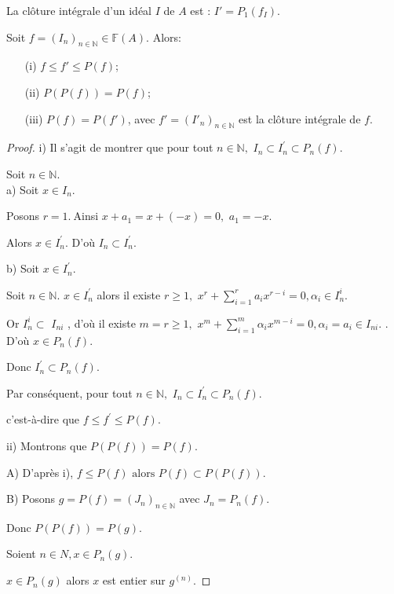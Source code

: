 \begin{maremarque}
	La clôture intégrale d'un idéal $I$ de $A$ est : $I'=P_1(f_I)$.
\end{maremarque}
\begin{maproposition}
	Soit $f=(I_n)_{n \in \mathbb{N}} \in \mathbb{F}(A)$. Alors:\\
	\begin{enumerate}
		\item[(i)] $ f \leqslant f' \leqslant P(f)$;
		\item[(ii)] $ P(P(f)) = P(f)$;
		\item[(iii)] $P(f) = P(f')$, avec $f'=(I'_n)_{n \in \mathbb{N}}$ est la clôture intégrale de $f$.
	\end{enumerate}
\end{maproposition}
\begin{proof}
	i) Il s'agit de montrer que pour tout $n\in \mathbb{N},$ $I_{n}\subset I_{n}^{\prime }\subset P_{n}(f)$.
	
	Soit $n\in \mathbb{N}.$ \\
	a) Soit $x\in I_{n}.$
	
	Posons $r=1.~$Ainsi $x+a_{1}=x+(-x)=0,$ $a_{1}=-x$.
	
	Alors $x\in I_{n}^{\prime }.$ D'où $I_{n}\subset I_{n}^{\prime }.$
	
	b) Soit $x\in I_{n}^{\prime }.$
	
	Soit $n\in \mathbb{N}.$
	$x\in I_{n}^{\prime }$ alors il existe $r\geq 1,$ $x^{r}+\sum\limits_{i=1}^{r}a_{i}x^{r-i}=0,\alpha _{i}\in I_{n}^{i}$.
	
	Or $I_{n}^{i}\subset $ $I_{ni}$ , d'où il existe $m=r\geq 1,$ $x^{m}+\sum\limits_{i=1}^{m}\alpha _{i}x^{m-i}=0,\alpha _{i}=a_{i}\in I_{ni}$.
	.
	D'où $x\in P_{n}(f)$.
	
	Donc $I_{n}^{\prime }\subset P_{n}(f)$.
	
	Par conséquent, pour tout $n\in \mathbb{N},$ $I_{n}\subset I_{n}^{\prime }\subset P_{n}(f).$
	
	c'est-\`{a}-dire que $f\leq f^{\prime }\leq P(f)$.
	
	ii) Montrons que $P(P(f))=P(f).$
	
	A) D'après i), $f\leq P(f)\text{ alors } P(f)\subset P(P(f))$.
	
	B) Posons $g=P(f)=(J_{n})_{n\in \mathbb{N}}$ avec $J_{n}=P_{n}(f)$.
	
	Donc $P(P(f))=P(g)$.
	
	Soient $n\in N,x\in P_{n}(g).$
	
	$x\in P_{n}(g)$ alors $x$ est entier sur $g^{(n)}$.
	

\end{proof}
